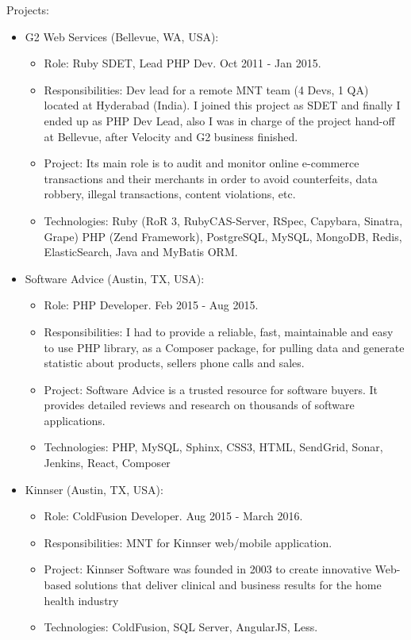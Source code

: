 \documentclass[11pt,a4paper,sans]{moderncv}        %
\begin{document}
  {
    Projects:\\
    \begin{itemize}
      \item G2 Web Services (Bellevue, WA, USA):
        \begin{itemize}
          \item Role: Ruby SDET, Lead PHP Dev. Oct 2011 - Jan 2015.
          \item Responsibilities: Dev lead for a remote MNT team (4 Devs, 1 QA) located at Hyderabad (India). I joined this project as SDET and finally I ended up as PHP Dev Lead, also I was in charge of the project hand-off at Bellevue, after Velocity and G2 business finished.
          \item Project: Its main role is to audit and monitor online e-commerce transactions and their merchants in order to avoid counterfeits, data robbery, illegal transactions, content violations, etc.
          \item Technologies: Ruby (RoR 3, RubyCAS-Server, RSpec, Capybara, Sinatra, Grape) PHP (Zend Framework), PostgreSQL, MySQL, MongoDB, Redis, ElasticSearch, Java and MyBatis ORM.
        \end{itemize}
      \item Software Advice (Austin, TX, USA):
       \begin{itemize}
          \item Role: PHP Developer. Feb 2015 - Aug 2015.
          \item Responsibilities: I had to provide a reliable, fast, maintainable and easy to use PHP library, as a Composer package, for pulling data and generate statistic about products, sellers phone calls and sales.
          \item Project: Software Advice is a trusted resource for software buyers. It provides detailed reviews and research on thousands of software applications.
          \item Technologies: PHP, MySQL, Sphinx, CSS3, HTML, SendGrid, Sonar, Jenkins, React, Composer
        \end{itemize}
      \item Kinnser (Austin, TX, USA):
       \begin{itemize}
          \item Role: ColdFusion Developer. Aug 2015 - March 2016.
          \item Responsibilities: MNT for Kinnser web/mobile application.
          \item Project: Kinnser Software was founded in 2003 to create innovative Web-based solutions that deliver clinical and business results for the home health industry
          \item Technologies: ColdFusion, SQL Server, AngularJS, Less.
        \end{itemize}
    \end{itemize}
  }
\end{document}
